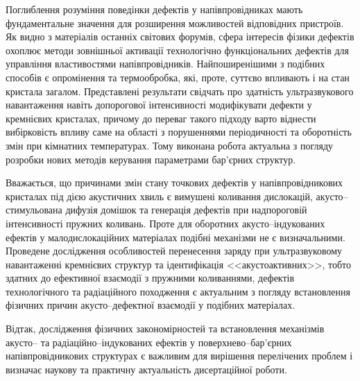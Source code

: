 Поглиблення розуміння поведінки дефектів у напівпровідниках мають фундаментальне значення для розширення можливостей відповідних пристроїв.
Як видно з матеріалів останніх світових форумів, сфера інтересів фізики дефектів охоплює методи  зовнішньої активації технологічно функціональних дефектів для управління властивостями напівпровідників.
Найпоширенішими з подібних способів є опромінення та термообробка, які, проте, суттєво впливають і на стан кристала загалом.
% 
Представлені результати свідчать про здатність ультразвукового навантаження навіть допорогової інтенсивності модифікувати дефекти у кремнієвих кристалах, причому до переваг такого підходу варто віднести вибірковість впливу саме на області з порушеннями періодичності та оборотність змін при кімнатних температурах.
Тому виконана робота актуальна з погляду розробки нових методів керування параметрами бар'єрних структур.

Вважається, що причинами змін стану точкових дефектів у напівпровідникових кристалах під дією акустичних хвиль є вимушені коливання дислокацій, акусто--стимульована дифузія домішок та генерація дефектів при надпороговій інтенсивності пружних коливань.
Проте для оборотних акусто--індукованих ефектів у малодислокаційних матеріалах
подібні механізми  не є визначальними.
Проведене дослідження особливостей перенесення заряду при ультразвуковому навантаженні кремнієвих структур та ідентифікація <<акустоактивних>>, тобто здатних до ефективної взаємодії з пружними коливаннями, дефектів технологічного та радіаційного походження
є актуальним з погляду встановлення фізичних причин акусто--дефектної взаємодії у подібних матеріалах.

Відтак,  дослідження фізичних  закономірностей  та встановлення механізмів акусто-- та радіаційно--індукованих
ефектів у поверхнево--бар'єрних напівпровідникових структурах  є  важливим  для  вирішення  перелічених  проблем  і визначає наукову та практичну актуальність дисертаційної роботи.


